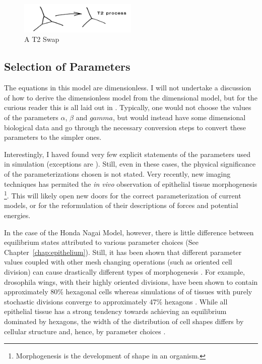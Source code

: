 \begin{figure}
\centering
\includegraphics[width=0.5\textwidth]{../diagrams/t2.png}
\caption{A T2 Swap}
\label{fig:t2}
\end{figure}

\subsection{Selection of Parameters}

The equations in this model are dimensionless. I will not undertake a discussion of how to derive the dimensionless model from the dimensional model, but for the curious reader this is all laid out in \cite{HondaNagai}. Typically, one would not choose the values of the parameters $\alpha$, $\beta$ and $gamma$, but would instead have some dimensional biological data and go through the necessary conversion steps to convert these parameters to the simpler ones\cite{NewOkuda}.

Interestingly, I haved found very few explicit statements of the parameters used in simulation (exceptions are \cite{WoundHealing}\cite{ChasteMain}\cite{NewOkuda}). Still, even in these cases, the physical significance of the parameterizations chosen is not stated. Very recently, new imaging techniques has permited the \emph{in vivo} observation of epithelial tissue morphogenesis \footnote{Morphogenesis is the development of shape in an organism.}\cite{Sokolow}\cite{Xiong}. This will likely open new doors for the correct parameterization of current models, or for the reformulation of their descriptions of forces and potential energies. 

In the case of the Honda Nagai Model, however, there is little difference between equilibrium states attributed to various parameter choices (See Chapter~\ref{chap:epithelium}). Still, it has been shown that different parameter values coupled with other mesh changing operations (such as oriented cell division) can cause drastically different types of morphogenesis \cite{Overview}. For example, drosophila wings, with their highly oriented divisions, have been shown to contain approximately 80\% hexagonal cells whereas simulations of of tissues with purely stochastic divisions converge to  approximately 47\% hexagons \cite{Epithelial Topology}. While all epithelial tissue has a strong tendency towards achieving an equilibrium dominated by hexagons, the width of the distribution of cell shapes differs by cellular structure and, hence, by parameter choices \cite{Soap}. 

